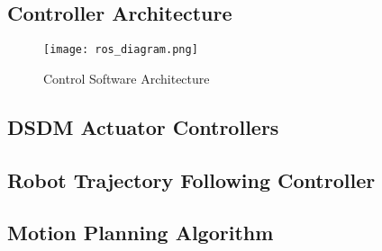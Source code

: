 
\subsection{Controller Architecture}

\begin{figure}[H]
	\centering
		\texttt{[image: ros\_diagram.png]}
	\caption{Control Software Architecture}
	\label{fig:ros_diagram}
\end{figure}



\subsection{DSDM Actuator Controllers}

\subsection{Robot Trajectory Following Controller}

\subsection{Motion Planning Algorithm}

